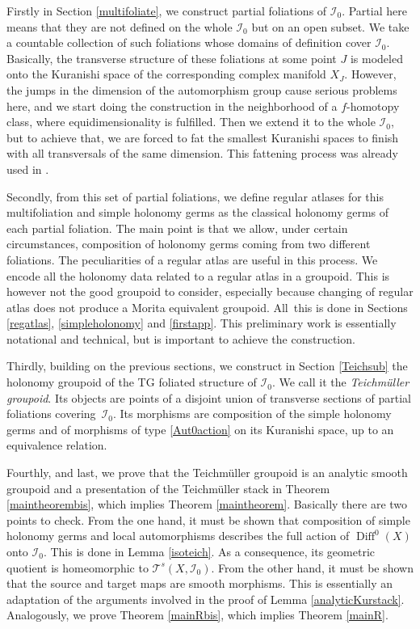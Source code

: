 \documentclass[10pt]{amsart}
\let\mathcal\mathscr
\DeclareMathOperator{\Diff}{Diff}
\theoremstyle{plain}
\theoremstyle{definition}
\theoremstyle{remark}
\numberwithin{equation}{section}
\newcommand{\cI}{\mathcal{I}}
\begin{document}
Firstly in Section \ref{multifoliate}, we construct partial foliations of $\cI_0$. Partial here means that they are not defined on the whole $\cI_0$ but on an open subset. We take a countable collection of such foliations whose domains of definition cover $\cI_0$. Basically, the transverse structure of these foliations at some point $J$ is modeled onto the Kuranishi space of the corresponding complex manifold $X_J$. However, the jumps in the dimension of the automorphism group cause serious problems here, and we start doing the construction in the neighborhood of a $f$-homotopy class, where equidimensionality is fulfilled. Then we extend it to the whole $\cI_0$, but to achieve that, we are forced to fat the smallest Kuranishi spaces to finish with all transversals of the same dimension. This fattening process was already used in \cite{circle}.

Secondly, from this set of partial foliations, we define regular atlases for this multifoliation and simple holonomy germs as the classical holonomy germs of each partial foliation. The main point is that we allow, under certain circumstances, composition of holonomy germs coming from two different foliations. The peculiarities of a regular atlas are useful in this process. We encode all the holonomy data related to a regular atlas in a groupoid. This is however not the good groupoid to consider, especially because changing of regular atlas does not produce a Morita equivalent groupoid. All~this is done in Sections \ref{regatlas}, \ref{simpleholonomy} and \ref{firstapp}. This preliminary work is essentially notational and technical, but is important to achieve the construction.

Thirdly, building on the previous sections, we construct in Section \ref{Teichsub} the holonomy groupoid of the TG foliated structure of $\cI_0$. We call it the \emph{Teichmüller groupoid}. Its objects are points of a disjoint union of transverse sections of partial foliations covering~$\cI_0$. Its morphisms are composition of the simple holonomy germs and of morphisms of type \eqref{Aut0action} on its Kuranishi space, up to an equivalence relation.

Fourthly, and last, we prove that the Teichmüller groupoid is an analytic smooth groupoid and a presentation of the Teichmüller stack in Theorem \ref{maintheorembis}, which implies Theorem \ref{maintheorem}. Basically there are two points to check. From the one hand, it must be shown that composition of simple holonomy germs and local automorphisms describes the full action of $\Diff^0(X)$ onto $\cI_0$. This is done in Lemma \ref{isoteich}. As a consequence, its geometric quotient is homeomorphic to $\mathcal T^s(X,\cI_0)$. From the other hand, it must be shown that the source and target maps are smooth morphisms. This is essentially an adaptation of the arguments involved in the proof of Lemma \ref{analyticKurstack}. Analogously, we prove Theorem \ref{mainRbis}, which implies Theorem \ref{mainR}.
\end{document}
